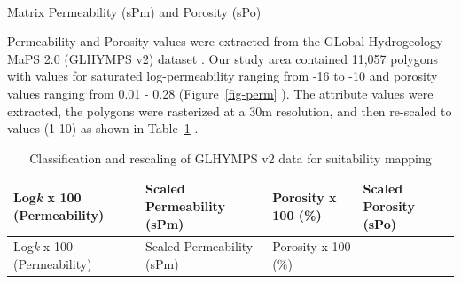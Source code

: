 \documentclass[
  number,
  preprint,
  3p,
  onecolumn]{elsarticle}
\makeatletter
\let\oldparagraph\paragraph
\renewcommand{\paragraph}{
    \@ifstar
      \xxxParagraphStar
      \xxxParagraphNoStar
  }
\newcommand{\xxxParagraphStar}[1]{\oldparagraph*{#1}\mbox{}}
\newcommand{\xxxParagraphNoStar}[1]{\oldparagraph{#1}\mbox{}}
\makeatother
\begin{document}
\paragraph{Matrix Permeability (sPm) and Porosity
(sPo)}\label{matrix-permeability-spm-and-porosity-spo}

Permeability and Porosity values were extracted from the GLobal
Hydrogeology MaPS 2.0 (GLHYMPS v2) dataset \citep{huscroft2018}. Our
study area contained 11,057 polygons with values for saturated
log-permeability ranging from -16 to -10 and porosity values ranging
from 0.01 - 0.28 (Figure~\ref{fig-perm} ). The attribute values were
extracted, the polygons were rasterized at a 30m resolution, and then
re-scaled to values (1-10) as shown in Table~\ref{tbl-glhymps} .

\begin{longtable}[]{@{}
  >{\raggedright\arraybackslash}p{}
  >{\raggedright\arraybackslash}p{}
  >{\raggedright\arraybackslash}p{}
  >{\raggedright\arraybackslash}p{}@{}}
\caption{Classification and rescaling of GLHYMPS v2 data for suitability
mapping}\label{tbl-glhymps}\tabularnewline
\toprule\noalign{}
\begin{minipage}[b]{\linewidth}\raggedright
Log\emph{k} x 100 (Permeability)
\end{minipage} & \begin{minipage}[b]{\linewidth}\raggedright
Scaled Permeability (sPm)
\end{minipage} & \begin{minipage}[b]{\linewidth}\raggedright
Porosity x 100 (\%)
\end{minipage} & \begin{minipage}[b]{\linewidth}\raggedright
Scaled Porosity (sPo)
\end{minipage} \\
\midrule\noalign{}
\endfirsthead
\toprule\noalign{}
\begin{minipage}[b]{\linewidth}\raggedright
Log\emph{k} x 100 (Permeability)
\end{minipage} & \begin{minipage}[b]{\linewidth}\raggedright
Scaled Permeability (sPm)
\end{minipage} & \begin{minipage}[b]{\linewidth}\raggedright
Porosity x 100 (\%)
\end{minipage} & \begin{minipage}[b]{\linewidth}\raggedright

\end{minipage}
\end{longtable}
\end{document}
